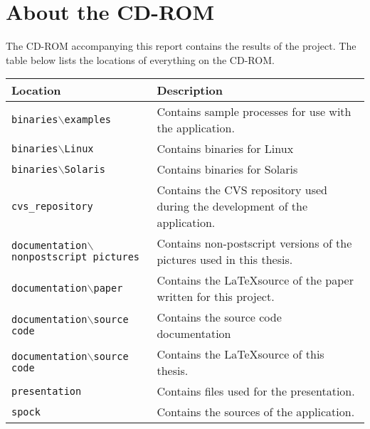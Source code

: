 
\chapter{About the CD-ROM}
\label{chap:cdrom}

The CD-ROM accompanying this report contains the results of the project. The
table below lists the locations of everything on the CD-ROM.

\begin{tabularx}{\textwidth}{X|X}
 \hline
 \textsf{Location} & Description \\
 \hline
 \texttt{binaries\(\backslash\)examples} & Contains sample processes for use with the application. \\
 \texttt{binaries\(\backslash\)Linux} & Contains binaries for Linux \\
 \texttt{binaries\(\backslash\)Solaris} & Contains binaries for Solaris \\
 \texttt{cvs\_repository} & Contains the CVS repository used during the development of the application. \\
 \texttt{documentation\(\backslash\)nonpostscript pictures} & Contains non-postscript versions of the pictures used in this thesis. \\
 \texttt{documentation\(\backslash\)paper} & Contains the \LaTeX source of the  paper written for this project. \\
 \texttt{documentation\(\backslash\)source code} & Contains the source code documentation \\
 \texttt{documentation\(\backslash\)source code} & Contains the \LaTeX source of  this thesis. \\
 \texttt{presentation} & Contains files used for the presentation. \\
 \texttt{spock} & Contains the sources of the application. \\
 \hline
\end{tabularx}
